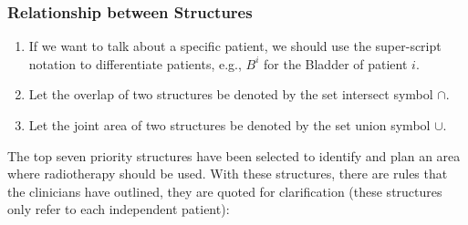 \documentclass[12pt,twoside]{report}
\begin{document}
\subsubsection{Relationship between Structures}

  \begin{enumerate}
    \item If we want to talk about a specific patient, we should use the super-script notation to differentiate patients, e.g., $B^i$ for the Bladder of patient $i$.
    \item Let the overlap of two structures be denoted by the set intersect symbol $\cap$.
    \item Let the joint area of two structures be denoted by the set union symbol $\cup$.
  \end{enumerate}


The top seven priority structures have been selected to identify and plan an area where radiotherapy should be used. With these structures, there are rules that the clinicians have outlined, they are quoted for clarification (these structures only refer to each independent patient):
\end{document}
